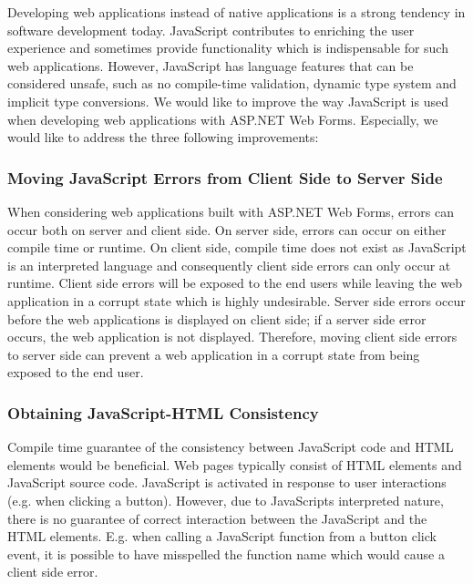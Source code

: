 
Developing web applications instead of native applications is a strong tendency in software development today. JavaScript contributes to enriching the user experience and sometimes provide functionality which is indispensable for such web applications. However, JavaScript has language features that can be considered unsafe, such as no compile-time validation, dynamic type system and implicit type conversions. We would like to improve the way JavaScript is used when developing web applications with ASP.NET Web Forms. Especially, we would like to address the three following improvements:

\subsubsection{Moving JavaScript Errors from Client Side to Server Side} %
	When considering web applications built with ASP.NET Web Forms, errors can occur both on server and client side. On server side, errors can occur on either compile time or runtime. On client side, compile time does not exist as JavaScript is an interpreted language and consequently client side errors can only occur at runtime. Client side errors will be exposed to the end users while leaving the web application in a corrupt state which is highly undesirable. Server side errors occur before the web applications is displayed on client side; if a server side error occurs, the web application is not displayed. Therefore, moving client side errors to server side can prevent a web application in a corrupt state from being exposed to the end user. 

\subsubsection{Obtaining JavaScript-HTML Consistency} %
\label{ssub:obtaining_javascript_html_consistency}
	Compile time guarantee of the consistency between JavaScript code and HTML elements would be beneficial. Web pages typically consist of HTML elements and JavaScript source code. JavaScript is activated in response to user interactions (e.g. when clicking a button). However, due to JavaScripts interpreted nature, there is no guarantee of correct interaction between the JavaScript and the HTML elements. E.g. when calling a JavaScript function from a button click event, it is possible to have misspelled the function name which would cause a client side error. 

